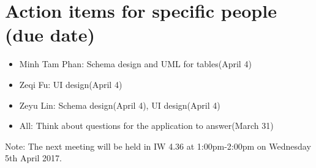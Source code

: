\documentclass[11pt, a4paper]{article}
\begin{document}
\section{Action items for specific people (due date)}
\begin{itemize}
	\item Minh Tam Phan: Schema design and UML for tables(April 4)
	\item Zeqi Fu: UI design(April 4)
	\item Zeyu Lin: Schema design(April 4), UI design(April 4)
	\item All: Think about questions for the application to answer(March 31) 
\end{itemize}



Note: The next meeting will be held in IW 4.36 at 1:00pm-2:00pm on Wednesday 5th April 2017.
\end{document}
